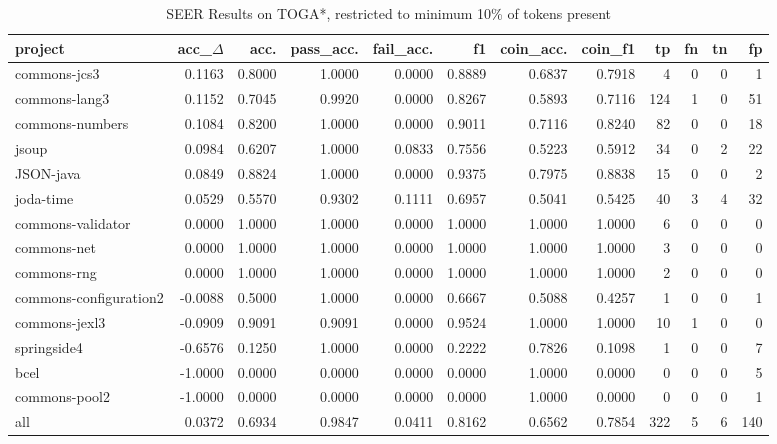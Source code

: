 \begin{table*}
\centering
\caption{SEER Results on TOGA*, restricted to minimum 10\% of tokens present}
\label{tab:toga_results_10}
\begin{tabular}{lrrrrrrrrrrr}
\toprule
                project &  acc\_$\Delta$ &    acc. &  pass\_acc. &  fail\_acc. &      f1 &  coin\_acc. &  coin\_f1 &   tp &  fn &  tn &   fp \\
\midrule
           commons-jcs3 &      0.1163 &  0.8000 &     1.0000 &     0.0000 &  0.8889 &     0.6837 &   0.7918 &    4 &   0 &   0 &    1 \\
          commons-lang3 &      0.1152 &  0.7045 &     0.9920 &     0.0000 &  0.8267 &     0.5893 &   0.7116 &  124 &   1 &   0 &   51 \\
        commons-numbers &      0.1084 &  0.8200 &     1.0000 &     0.0000 &  0.9011 &     0.7116 &   0.8240 &   82 &   0 &   0 &   18 \\
                  jsoup &      0.0984 &  0.6207 &     1.0000 &     0.0833 &  0.7556 &     0.5223 &   0.5912 &   34 &   0 &   2 &   22 \\
              JSON-java &      0.0849 &  0.8824 &     1.0000 &     0.0000 &  0.9375 &     0.7975 &   0.8838 &   15 &   0 &   0 &    2 \\
              joda-time &      0.0529 &  0.5570 &     0.9302 &     0.1111 &  0.6957 &     0.5041 &   0.5425 &   40 &   3 &   4 &   32 \\
      commons-validator &      0.0000 &  1.0000 &     1.0000 &     0.0000 &  1.0000 &     1.0000 &   1.0000 &    6 &   0 &   0 &    0 \\
            commons-net &      0.0000 &  1.0000 &     1.0000 &     0.0000 &  1.0000 &     1.0000 &   1.0000 &    3 &   0 &   0 &    0 \\
            commons-rng &      0.0000 &  1.0000 &     1.0000 &     0.0000 &  1.0000 &     1.0000 &   1.0000 &    2 &   0 &   0 &    0 \\
 commons-configuration2 &     -0.0088 &  0.5000 &     1.0000 &     0.0000 &  0.6667 &     0.5088 &   0.4257 &    1 &   0 &   0 &    1 \\
          commons-jexl3 &     -0.0909 &  0.9091 &     0.9091 &     0.0000 &  0.9524 &     1.0000 &   1.0000 &   10 &   1 &   0 &    0 \\
            springside4 &     -0.6576 &  0.1250 &     1.0000 &     0.0000 &  0.2222 &     0.7826 &   0.1098 &    1 &   0 &   0 &    7 \\
                   bcel &     -1.0000 &  0.0000 &     0.0000 &     0.0000 &  0.0000 &     1.0000 &   0.0000 &    0 &   0 &   0 &    5 \\
          commons-pool2 &     -1.0000 &  0.0000 &     0.0000 &     0.0000 &  0.0000 &     1.0000 &   0.0000 &    0 &   0 &   0 &    1 \\
                    all &      0.0372 &  0.6934 &     0.9847 &     0.0411 &  0.8162 &     0.6562 &   0.7854 &  322 &   5 &   6 &  140 \\
\bottomrule
\end{tabular}
\end{table*}

